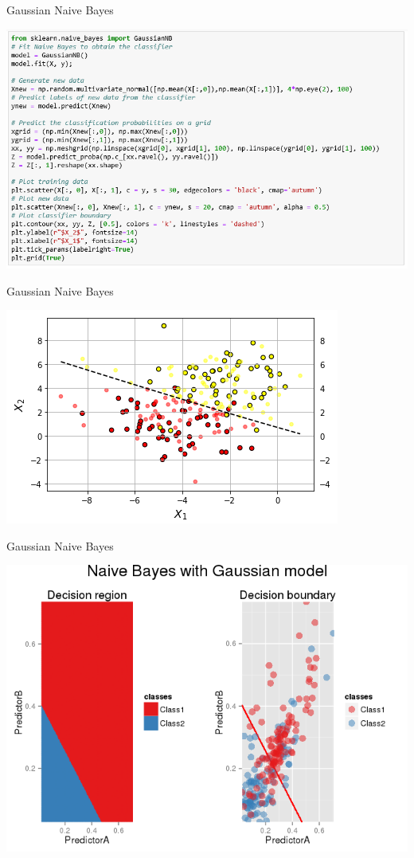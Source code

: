 \documentclass[9pt]{beamer}
\begin{document}
\begin{frame}{Gaussian Naive Bayes}
\begin{center}
\includegraphics[width=\linewidth]{./naivebayes_classif1}
\end{center}
\end{frame}

\begin{frame}{Gaussian Naive Bayes}
\begin{center}
\includegraphics[width=0.8\linewidth]{./naivebayes_classif2}
\end{center}
\end{frame}

\begin{frame}{Gaussian Naive Bayes }
\begin{center}
\hspace*{-.05\textwidth}\includegraphics[height=.65\textheight]{Classical_Naive_Bayes-1}
\end{center}
\end{frame}
\end{document}
